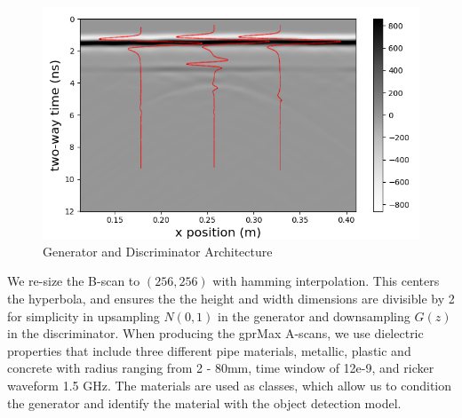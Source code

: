 \begin{figure}[H]
  \centering
  \includegraphics[width=1.0\linewidth]{figures/originalBScan.png}
  \caption{Generator and Discriminator Architecture}
  \label{fig:originalBscan}
\end{figure}

We re-size the B-scan to $(256,256)$ with hamming interpolation. This centers the hyperbola, and ensures the the height and width dimensions are divisible by 2 for simplicity in upsampling $N(0,1)$ in the generator and downsampling $G(z)$ in the discriminator. When producing the gprMax A-scans, we use dielectric properties that include three different pipe materials, metallic, plastic and concrete with radius ranging from 2 - 80mm, time window of 12e-9, and ricker waveform 1.5 GHz. The materials are used as classes, which allow us to condition the generator and identify the material with the object detection model.

